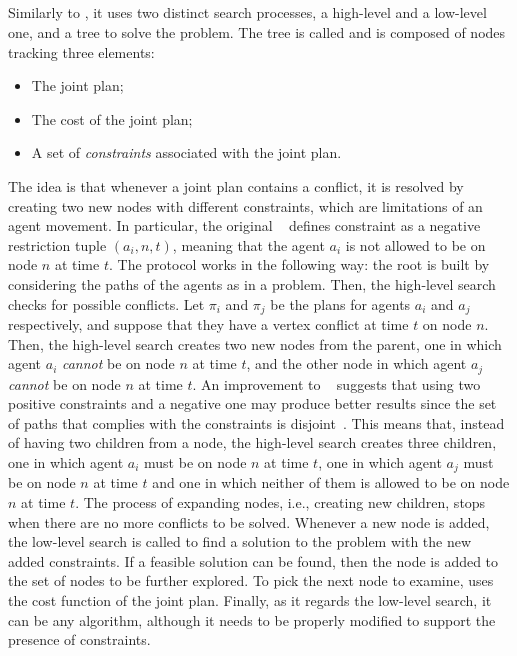 \subsection{}
\label{ssec:cbs}
Similarly to , it uses two distinct search processes, a high-level 
and a low-level one, and a tree to solve the  problem. \newline
The  tree is called  and is composed of nodes tracking three
elements: 
\begin{itemize}
  \item The joint plan; 
  \item The cost of the joint plan;
  \item A set of \textit{constraints} associated with the joint plan.
\end{itemize}
The idea is that whenever a joint plan contains a conflict, it is resolved by
creating two new nodes with different constraints, which are limitations of an
agent movement. In particular, the original ~\cite{CBS} defines
constraint as a negative restriction tuple $(a_i, n, t)$, meaning that the
agent $a_i$ is not allowed to be on node $n$ at time $t$. \newline
The protocol works in the following way: the root is built by considering the
paths of the agents as in a  problem. Then, the high-level search
checks for possible conflicts. Let $\pi_i$ and $\pi_j$ be the plans for agents
$a_i$ and $a_j$ respectively, and suppose that they have a vertex conflict at
time $t$ on node $n$. Then, the high-level search creates two new 
nodes from the parent, one in which agent $a_i$ \textit{cannot} be on node $n$
at time $t$, and the other  node in which agent $a_j$ \textit{cannot}
be on node $n$ at time $t$. \newline
An improvement to ~\cite{ICBS} suggests that using two positive
constraints and a negative one may produce better results since the set of
paths that complies with the constraints is disjoint~\cite{MAPF_overview}. This
means that, instead of having two children from a node, the high-level search
creates three children, one in which agent $a_i$ must be on node $n$ at time
$t$, one in which agent $a_j$ must be on node $n$ at time $t$ and one in which
neither of them is allowed to be on node $n$ at time $t$. \newline
The process of expanding nodes, i.e., creating new children, stops when there
are no more conflicts to be solved. \newline
Whenever a new node is added, the low-level search is called to find a solution
to the problem with the new added constraints. If a feasible solution can be
found, then the node is added to the set of nodes to be further explored. To
pick the next node to examine,  uses the cost function of the joint
plan. \newline
Finally, as it regards the low-level search, it can be any 
algorithm, although it needs to be properly modified to support the presence of
constraints. 
%
